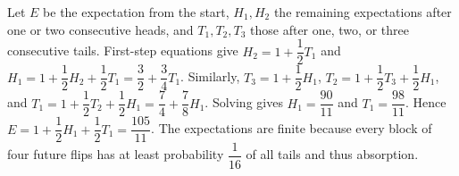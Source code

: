 Let $E$ be the expectation from the start, $H_1,H_2$ the remaining expectations after one or two consecutive heads, and $T_1,T_2,T_3$ those after one, two, or three consecutive tails. First-step equations give $H_2=1+\dfrac{1}{2}T_1$ and $H_1=1+\dfrac{1}{2}H_2+\dfrac{1}{2}T_1=\dfrac{3}{2}+\dfrac{3}{4}T_1$. Similarly, $T_3=1+\dfrac{1}{2}H_1$, $T_2=1+\dfrac{1}{2}T_3+\dfrac{1}{2}H_1$, and $T_1=1+\dfrac{1}{2}T_2+\dfrac{1}{2}H_1=\dfrac{7}{4}+\dfrac{7}{8}H_1$. Solving gives $H_1=\dfrac{90}{11}$ and $T_1=\dfrac{98}{11}$. Hence $E=1+\dfrac{1}{2}H_1+\dfrac{1}{2}T_1=\boxed{\dfrac{105}{11}}$. The expectations are finite because every block of four future flips has at least probability $\dfrac{1}{16}$ of all tails and thus absorption.
